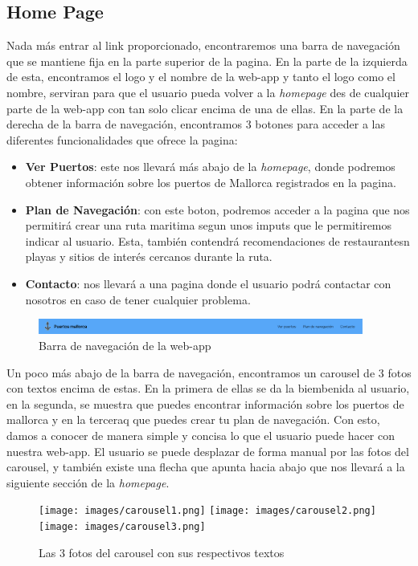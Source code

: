 \documentclass{article}
\begin{document}
\subsection{Home Page}
Nada más entrar al link proporcionado, encontraremos una barra de navegación que se mantiene fija en la parte superior de la pagina. En la parte de la izquierda de esta, encontramos el logo y el nombre de la web-app y tanto el logo como el nombre, serviran para que el usuario pueda volver a la \textit{homepage} des de cualquier parte de la web-app con tan solo clicar encima de una de ellas. En la parte de la derecha de la barra de navegación, encontramos 3 botones para acceder a las diferentes funcionalidades que ofrece la pagina:
\begin{itemize}
    \item \textbf{Ver Puertos}: este nos llevará más abajo de la \textit{homepage}, donde podremos obtener información sobre los puertos de Mallorca registrados en la pagina.
    \item \textbf{Plan de Navegación}: con este boton, podremos acceder a la pagina que nos permitirá crear una ruta maritima segun unos imputs que le permitiremos indicar al usuario. Esta, también contendrá recomendaciones de restaurantesn playas y sitios de interés cercanos durante la ruta.
    \item \textbf{Contacto}: nos llevará a una pagina donde el usuario podrá contactar con nosotros en caso de tener cualquier problema.
\end{itemize}
\begin{figure}[ht]
    \centering
    \includegraphics[width=0.95\textwidth]{images/nvbar.png}
    \caption{Barra de navegación de la web-app}
\end{figure}
Un poco más abajo de la barra de navegación, encontramos un carousel de 3 fotos con textos encima de estas. En la primera de ellas se da la biembenida al usuario, en la segunda, se muestra que puedes encontrar información sobre los puertos de mallorca y en la terceraq que puedes crear tu plan de navegación. Con esto, damos a conocer de manera simple y concisa lo que el usuario puede hacer con nuestra web-app. El usuario se puede desplazar de forma manual por las fotos del carousel, y también existe una flecha que apunta hacia abajo que nos llevará a la siguiente sección de la \textit{homepage}.
\newpage
\begin{figure}[ht]
    \centering
    \texttt{[image: images/carousel1.png]}
    \texttt{[image: images/carousel2.png]}
    \texttt{[image: images/carousel3.png]}
    \caption{Las 3 fotos del carousel con sus respectivos textos}
\end{figure}
\end{document}
